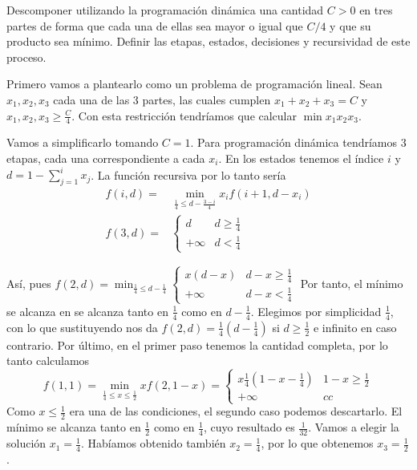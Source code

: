 \documentclass[twoside]{article}
\begin{document}
\newpage 
\begin{ejercicio}{6}\label{6}
Descomponer utilizando la programación dinámica una cantidad $C > 0$ en tres partes de forma
que cada una de ellas sea mayor o igual que $C/4$ y que su producto sea mínimo. Definir las etapas,
estados, decisiones y recursividad de este proceso.
\end{ejercicio}
\begin{solucion}
Primero vamos a plantearlo como un problema de programación lineal. Sean $x_1,x_2,x_3$ cada una de las 3 partes, las cuales cumplen $x_1+x_2+x_3=C$ y $x_1,x_2,x_3\geq\frac{C}{4}$. Con esta restricción tendríamos que calcular $\min x_1x_2x_3$. 

Vamos a simplificarlo tomando $C=1$. Para programación dinámica tendríamos 3 etapas, cada una correspondiente a cada $x_i$. En los estados tenemos el índice $i$ y $d=1-\sum_{j=1}^ix_j$. La función recursiva por lo tanto sería
\begin{align*}
f(i,d)=&\min_{\frac{1}{4}\leq d-\frac{3-i}{4}} x_if(i+1,d-x_i)\\
f(3,d)=&\begin{cases}
d & d\geq\frac{1}{4}\\
+\infty & d<\frac{1}{4}
\end{cases}
\end{align*}

Así, pues $f(2,d)=\min_{\frac{1}{4}\leq d-\frac{1}{4}}\begin{cases}
x(d-x) & d-x\geq\frac{1}{4}\\
+\infty & d-x <\frac{1}{4}
\end{cases}$
Por tanto, el mínimo se alcanza en  se alcanza tanto en $\frac{1}{4}$ como en $d-\frac{1}{4}$. Elegimos por simplicidad $\frac{1}{4}$, con lo que sustituyendo nos da $f(2,d)=\frac{1}{4}(d-\frac{1}{4})$ si $d\geq\frac{1}{2}$ e infinito en caso contrario. Por último, en el primer paso tenemos la cantidad completa, por lo tanto calculamos
$$f(1,1)=\min_{\frac{1}{4}\leq x\leq\frac{1}{2}}xf(2,1-x)=\begin{cases}
x\frac{1}{4}(1-x-\frac{1}{4}) & 1-x\geq\frac{1}{2}\\
+\infty & cc
\end{cases}$$
Como $x\leq\frac{1}{2}$ era una de las condiciones, el segundo caso podemos descartarlo. El mínimo se alcanza tanto en $\frac{1}{2}$ como en $\frac{1}{4}$, cuyo resultado es $\frac{1}{32}$. Vamos a elegir la solución $x_1=\frac{1}{4}$. Habíamos obtenido también $x_2=\frac{1}{4}$, por lo que obtenemos $x_3=\frac{1}{2}$.
\end{solucion}
\end{document}
